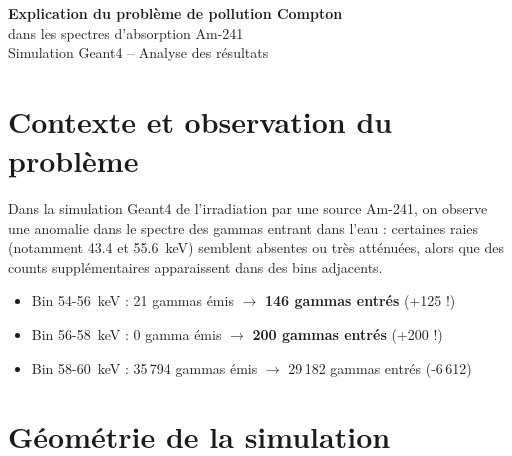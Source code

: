 \documentclass[11pt,a4paper]{article}
\begin{document}
\begin{center}
    {\LARGE\bfseries Explication du problème de pollution Compton}\\[0.3cm]
    {\large dans les spectres d'absorption Am-241}\\[0.5cm]
    {\normalsize Simulation Geant4 -- Analyse des résultats}
\end{center}

\vspace{0.5cm}

\section{Contexte et observation du problème}

Dans la simulation Geant4 de l'irradiation par une source Am-241, on observe une anomalie dans le spectre des gammas entrant dans l'eau : certaines raies (notamment 43.4 et 55.6~keV) semblent absentes ou très atténuées, alors que des counts supplémentaires apparaissent dans des bins adjacents.

\begin{tcolorbox}[colback=red!5!white, colframe=red!75!black, title=\textbf{Observation problématique}]
\begin{itemize}
    \item Bin 54-56~keV : 21 gammas émis $\rightarrow$ \textbf{146 gammas entrés} (+125 !)
    \item Bin 56-58~keV : 0 gamma émis $\rightarrow$ \textbf{200 gammas entrés} (+200 !)
    \item Bin 58-60~keV : 35\,794 gammas émis $\rightarrow$ 29\,182 gammas entrés (-6\,612)
\end{itemize}
\end{tcolorbox}

\section{Géométrie de la simulation}
\end{document}
